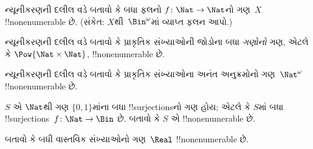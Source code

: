 \documentclass[../../../include/open-logic-section]{subfiles}
\begin{document}
\begin{prob}\label{sfr:siz:red-alt:prob:nat-nat}
  ન્યૂનીકરણની દલીલ વડે બતાવો કે બધા ફલનો
  $f\colon \Nat \to \Nat$નો ગણ~$X$ !!{nonenumerable} છે.
  (સંકેત: $X$થી~$\Bin^\omega$માં વ્યાપ્ત ફલન આપો.)
\end{prob}

\begin{prob}
ન્યૂનીકરણની દલીલ વડે બતાવો કે પ્રાકૃતિક સંખ્યાઓની જોડોના બધા
\emph{ગણોનો} ગણ, એટલે કે $\Pow{\Nat \times \Nat}$, !!{nonenumerable} છે.
\end{prob}

\begin{prob}
ન્યૂનીકરણની દલીલ વડે બતાવો કે પ્રાકૃતિક સંખ્યાઓના અનંત
અનુક્રમોનો ગણ~$\Nat^\omega$ !!{nonenumerable} છે.
\end{prob}


\begin{prob}
$S$ એ $\Nat$થી ગણ $\{0,1\}$માંના બધા !!{surjection}sનો ગણ હોય;
એટલે કે $S$માં બધા !!{surjection}s~$f \colon \Nat \to \Bin$ છે.
બતાવો કે $S$ એ !!{nonenumerable} છે.
\end{prob}

\begin{prob}
બતાવો કે બધી વાસ્તવિક સંખ્યાઓનો ગણ~$\Real$ !!{nonenumerable} છે.
\end{prob}
\end{document}
